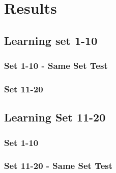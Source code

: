 \chapter{Results}

\section{Learning set 1-10}
\subsection{Set 1-10 - Same Set Test}


\subsection{Set 11-20}



\section{Learning Set 11-20}
\subsection{Set 1-10}


\subsection{Set 11-20 - Same Set Test}





